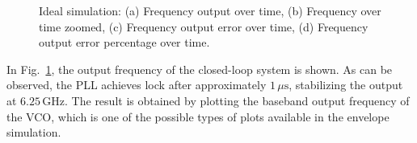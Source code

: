 \documentclass[lettersize,journal]{IEEEtran}
\begin{document}
\begin{figure}[!ht]
    \centering
    \hfil
    \hfil
    \hfil
    \hfil
    \caption{Ideal simulation: (a) Frequency output over time, (b) Frequency over time zoomed, (c) Frequency output error over time, (d) Frequency output error percentage over time.}
    \label{fig:freq_VCO_ideal_and_zoomed}
\end{figure}

In Fig.~\ref{fig:freq_VCO_ideal_and_zoomed}, the output frequency of the closed-loop system is shown. As can be observed, the PLL achieves lock after approximately \(1 \, \mu\text{s}\), stabilizing the output at \(6.25 \, \text{GHz}\). The result is obtained by plotting the baseband output frequency of the VCO, which is one of the possible types of plots available in the envelope simulation.
\end{document}
